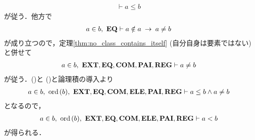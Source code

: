 \begin{prf}
\begin{description}
\begin{align}
					\vdash a \leq b
					\label{fom:element_and_proper_subset_correspond_3}
				\end{align}
				が従う．他方で
				\begin{align}
					a \in b,\ \mbox{{\bf EQ}} \vdash a \notin a \hspace{0.25em}\rightarrow\hspace{0.25em} a \neq b
				\end{align}
				が成り立つので，定理\ref{thm:no_class_contains_itself}
				(自分自身は要素ではない)と併せて
				\begin{align}
					a \in b,\ \mbox{{\bf EXT}},\mbox{{\bf EQ}},\mbox{\bf COM},\mbox{{\bf PAI}},\mbox{{\bf REG}} \vdash 
					a \neq b
					\label{fom:element_and_proper_subset_correspond_4}
				\end{align}
				が従う．()と
				()と論理積の導入より
				\begin{align}
					a \in b,\ \ord{b},\ \EXTAX,\EQAX,\COMAX,\ELEAX,\PAIAX,\REGAX 
					\vdash a \leq b \wedge a \neq b
				\end{align}
				となるので，
				\begin{align}
					a \in b,\ \ord{b},\ \EXTAX,\EQAX,\COMAX,\ELEAX,\PAIAX,\REGAX \vdash a < b
					\label{fom:element_and_proper_subset_correspond_21}
				\end{align}
				が得られる．
				

\end{description}
\end{prf}
